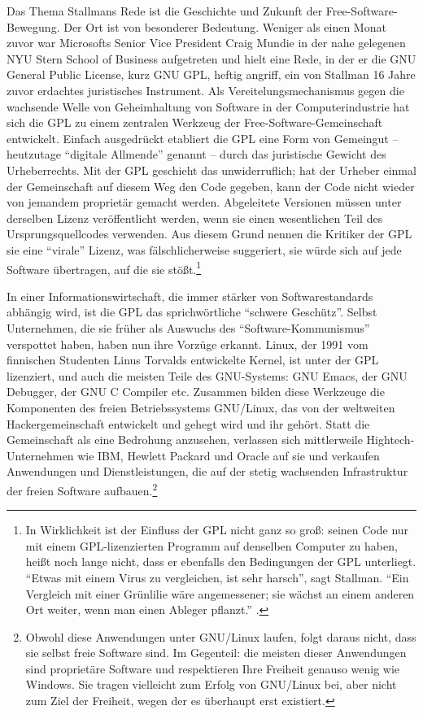 Das Thema Stallmans Rede ist die Geschichte und Zukunft der Free-Software-Bewegung. Der Ort ist von besonderer Bedeutung. Weniger als einen Monat zuvor war Microsofts Senior Vice President Craig Mundie in der nahe gelegenen NYU Stern School of Business aufgetreten und hielt eine Rede, in der er die GNU General Public License, kurz GNU GPL, heftig angriff, ein von Stallman 16 Jahre zuvor erdachtes juristisches Instrument. Als Vereitelungsmechanismus gegen die wachsende Welle von Geheimhaltung von Software in der Computerindustrie hat sich die GPL zu einem zentralen Werkzeug der Free-Software-Gemeinschaft entwickelt. Einfach ausgedrückt etabliert die GPL eine Form von Gemeingut – heutzutage "`digitale Allmende"' genannt – durch das juristische Gewicht des Urheberrechts. Mit der GPL geschieht das unwiderruflich; hat der Urheber einmal der Gemeinschaft auf diesem Weg den Code gegeben, kann der Code nicht wieder von jemandem proprietär gemacht werden. Abgeleitete Versionen müssen unter derselben Lizenz veröffentlicht werden, wenn sie einen wesentlichen Teil des Ursprungsquellcodes verwenden. Aus diesem Grund nennen die Kritiker der GPL sie eine "`virale"' Lizenz, was fälschlicherweise suggeriert, sie würde sich auf jede Software übertragen, auf die sie stößt.\footnote{In Wirklichkeit ist der Einfluss der GPL nicht ganz so groß: seinen Code nur mit einem GPL-lizenzierten Programm auf denselben Computer zu haben, heißt noch lange nicht, dass er ebenfalls den Bedingungen der GPL unterliegt. "`Etwas mit einem Virus zu vergleichen, ist sehr harsch"', sagt Stallman. "`Ein Vergleich mit einer Grünlilie wäre angemessener; sie wächst an einem anderen Ort weiter, wenn man einen Ableger pflanzt."' \cite[Vgl.][]{gpl}.}

In einer Informationswirtschaft, die immer stärker von Softwarestandards abhängig wird, ist die GPL das sprichwörtliche "`schwere Geschütz"'. Selbst Unternehmen, die sie früher als Auswuchs des "`Software-Kommunismus"' verspottet haben, haben nun ihre Vorzüge erkannt. Linux, der 1991 vom finnischen Studenten Linus Torvalds entwickelte Kernel, ist unter der GPL lizenziert, und auch die meisten Teile des GNU-Systems: GNU Emacs, der GNU Debugger, der GNU C Compiler etc. Zusammen bilden diese Werkzeuge die Komponenten des freien Betriebssystems GNU/Linux, das von der weltweiten Hackergemeinschaft entwickelt und gehegt wird und ihr gehört. Statt die Gemeinschaft als eine Bedrohung anzusehen, verlassen sich mittlerweile Hightech-Unternehmen wie IBM, Hewlett Packard und Oracle auf sie und verkaufen Anwendungen und Dienstleistungen, die auf der stetig wachsenden Infrastruktur der freien Software aufbauen.\footnote{Obwohl diese Anwendungen unter GNU/Linux laufen, folgt daraus nicht, dass sie selbst freie Software sind. Im Gegenteil: die meisten dieser Anwendungen sind proprietäre Software und respektieren Ihre Freiheit genauso wenig wie Windows. Sie tragen vielleicht zum Erfolg von GNU/Linux bei, aber nicht zum Ziel der Freiheit, wegen der es überhaupt erst existiert.}

